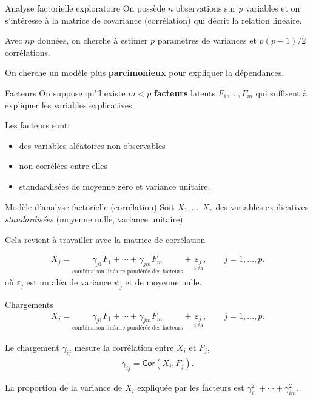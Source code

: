 \documentclass[
  ignorenonframetext,
]{beamer}
\providecommand{\tightlist}{%
  \setlength{\itemsep}{0pt}\setlength{\parskip}{0pt}}\usepackage{longtable,booktabs,array}
\begin{document}
\begin{frame}{Analyse factorielle exploratoire}
\protect\hypertarget{analyse-factorielle-exploratoire-1}{}
On possède \(n\) observations sur \(p\) variables et on s'intéresse à la
matrice de covariance (corrélation) qui décrit la relation linéaire.

Avec \(np\) données, on cherche à estimer \(p\) paramètres de variances
et \(p(p-1)/2\) corrélations.

On cherche un modèle plus \textbf{parcimonieux} pour expliquer la
dépendances.
\end{frame}

\begin{frame}{Facteurs}
\protect\hypertarget{facteurs}{}
On suppose qu'il existe \(m < p\) \textbf{facteurs} latents
\(F_1, \ldots, F_m\) qui suffisent à expliquer les variables
explicatives

Les facteurs sont:

\begin{itemize}
\tightlist
\item
  des variables aléatoires non observables
\item
  non corrélées entre elles
\item
  standardisées de moyenne zéro et variance unitaire.
\end{itemize}
\end{frame}

\begin{frame}{Modèle d'analyse factorielle (corrélation)}
\protect\hypertarget{moduxe8le-danalyse-factorielle-corruxe9lation}{}
Soit \(X_1, \ldots, X_p\) des variables explicatives
\emph{standardisées} (moyenne nulle, variance unitaire).

Cela revient à travailler avec la matrice de corrélation

\begin{align*}
X_j = \underset{\text{combinaison linéaire pondérée des facteurs}}{\gamma_{j1}F_1 + \cdots + \gamma_{jm}F_m} + \underset{\text{aléa}}{\varepsilon_j},\qquad j=1, \ldots, p.
\end{align*} où \(\varepsilon_j\) est un aléa de variance \(\psi_j\) et
de moyenne nulle.
\end{frame}

\begin{frame}{Chargements}
\protect\hypertarget{chargements}{}
\begin{align*}
X_j = \underset{\text{combinaison linéaire pondérée des facteurs}}{\gamma_{j1}F_1 + \cdots + \gamma_{jm}F_m} + \underset{\text{aléa}}{\varepsilon_j}, \qquad j=1, \ldots, p.
\end{align*}

Le chargement \(\gamma_{ij}\) mesure la corrélation entre \(X_i\) et
\(F_j\), \begin{align*}
\gamma_{ij} = \mathsf{Cor}(X_i, F_j).
\end{align*}

La proportion de la variance de \(X_i\) expliquée par les facteurs est
\(\gamma_{i1}^2 + \cdots + \gamma_{im}^2\).
\end{frame}
\end{document}
